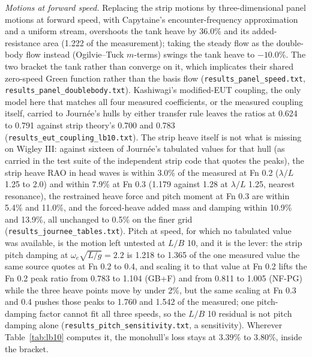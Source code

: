 \documentclass[conference]{IEEEtran}
\begin{document}
\emph{Motions at forward speed.} Replacing the strip motions by three-dimensional panel motions at forward speed, with Capytaine's encounter-frequency approximation and a uniform stream, overshoots the tank heave by 36.0\% and its added-resistance area (1.222 of the measurement); taking the steady flow as the double-body flow instead (Ogilvie--Tuck $m$-terms) swings the tank heave to $-10.0$\%. The two bracket the tank rather than converge on it, which implicates their shared zero-speed Green function rather than the basis flow (\texttt{results\_panel\_speed.txt}, \texttt{results\_panel\_doublebody.txt}). Kashiwagi's modified-EUT coupling, the only model here that matches all four measured coefficients, or the measured coupling itself, carried to Journ\'ee's hulls by either transfer rule leaves the ratios at 0.624 to 0.791 against strip theory's 0.700 and 0.783 (\texttt{results\_eut\_coupling\_lb10.txt}). The strip heave itself is not what is missing on Wigley III: against sixteen of Journ\'ee's tabulated values for that hull (as carried in the test suite of the independent strip code that quotes the peaks), the strip heave RAO in head waves is within 3.0\% of the measured at Fn 0.2 ($\lambda/L$ 1.25 to 2.0) and within 7.9\% at Fn 0.3 (1.179 against 1.28 at $\lambda/L$ 1.25, nearest resonance), the restrained heave force and pitch moment at Fn 0.3 are within 5.4\% and 11.0\%, and the forced-heave added mass and damping within 10.9\% and 13.9\%, all unchanged to 0.5\% on the finer grid (\texttt{results\_journee\_tables.txt}). Pitch at speed, for which no tabulated value was available, is the motion left untested at $L/B$ 10, and it is the lever: the strip pitch damping at $\omega_e\sqrt{L/g}=2.2$ is 1.218 to 1.365 of the one measured value the same source quotes at Fn 0.2 to 0.4, and scaling it to that value at Fn 0.2 lifts the Fn 0.2 peak ratio from 0.783 to 1.104 (GB+F) and from 0.811 to 1.005 (NF-PG) while the three heave points move by under 2\%, but the same scaling at Fn 0.3 and 0.4 pushes those peaks to 1.760 and 1.542 of the measured; one pitch-damping factor cannot fit all three speeds, so the $L/B$ 10 residual is not pitch damping alone (\texttt{results\_pitch\_sensitivity.txt}, a sensitivity). Wherever Table~\ref{tab:lb10} computes it, the monohull's loss stays at 3.39\% to 3.80\%, inside the bracket.
\end{document}
